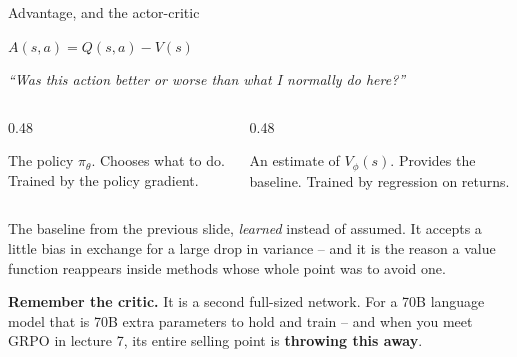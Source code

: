 \documentclass[aspectratio=169]{beamer}
\begin{document}
\begin{frame}{Advantage, and the actor-critic}
  \begin{center}
    {\large $A(s,a) = Q(s,a) - V(s)$}
  \end{center}

  \vskip 4pt
  \begin{center}
    \small \emph{``Was this action better or worse than what I normally do here?''}
  \end{center}

  \vskip 8pt
  \begin{columns}[T]
    \begin{column}{0.48\textwidth}
      \begin{tcolorbox}[colback=armblue!8, colframe=armblue, boxrule=0.6pt, arc=2pt,
                        title={\textbf{Actor}}]
        \small The policy $\pi_\theta$. Chooses what to do. Trained by the policy gradient.
      \end{tcolorbox}
    \end{column}
    \begin{column}{0.48\textwidth}
      \begin{tcolorbox}[colback=paramgreen!8, colframe=paramgreen, boxrule=0.6pt, arc=2pt,
                        title={\textbf{Critic}}]
        \small An estimate of $V_\phi(s)$. Provides the baseline. Trained by regression on
        returns.
      \end{tcolorbox}
    \end{column}
  \end{columns}

  \vskip 8pt
  \small
  The baseline from the previous slide, \emph{learned} instead of assumed. It accepts a little
  bias in exchange for a large drop in variance -- and it is the reason a value function
  reappears inside methods whose whole point was to avoid one.

  \vskip 6pt
  \begin{tcolorbox}[colback=armorange!12, colframe=armorange, boxrule=0.6pt, arc=2pt]
    \small
    \textbf{Remember the critic.} It is a second full-sized network. For a 70B language model
    that is 70B extra parameters to hold and train -- and when you meet GRPO in lecture 7, its
    entire selling point is \textbf{throwing this away}.
  \end{tcolorbox}
\end{frame}
\end{document}
